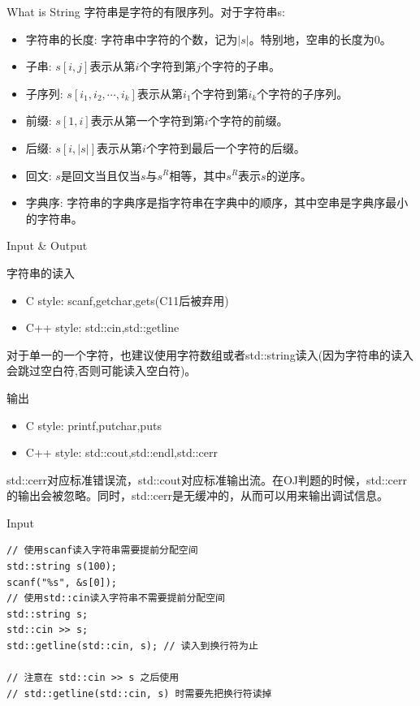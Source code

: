 \documentclass{ldr-simple-gray}
\begin{document}
  \begin{frame}{What is String}
    字符串是字符的有限序列。对于字符串s:
    \begin{itemize}
      \item 字符串的长度: 字符串中字符的个数，记为$|s|$。特别地，空串的长度为0。
      \item 子串: $s[i,j]$表示从第$i$个字符到第$j$个字符的子串。
      \item 子序列: $s[i_1,i_2,\cdots,i_k]$表示从第$i_1$个字符到第$i_k$个字符的子序列。
      \item 前缀: $s[1,i]$表示从第一个字符到第$i$个字符的前缀。
      \item 后缀: $s[i,|s|]$表示从第$i$个字符到最后一个字符的后缀。
      \item 回文: $s$是回文当且仅当$s$与$s^R$相等，其中$s^R$表示$s$的逆序。
      \item 字典序: 字符串的字典序是指字符串在字典中的顺序，其中空串是字典序最小的字符串。
    \end{itemize}
  \end{frame}

  \begin{frame}{Input \& Output}
    \begin{block}{字符串的读入}
      \begin{itemize}
        \item C style: scanf,getchar,gets(C11后被弃用)
        \item C++ style: std::cin,std::getline
      \end{itemize}
    \end{block}
    对于单一的一个字符，也建议使用字符数组或者std::string读入(因为字符串的读入会跳过空白符,否则可能读入空白符)。
    \begin{block}{输出}
      \begin{itemize}
        \item C style: printf,putchar,puts
        \item C++ style: std::cout,std::endl,std::cerr
      \end{itemize}
    \end{block}
    std::cerr对应标准错误流，std::cout对应标准输出流。在OJ判题的时候，std::cerr的输出会被忽略。同时，std::cerr是无缓冲的，从而可以用来输出调试信息。
  \end{frame}

  \begin{frame}[fragile]{Input}
    \begin{verbatim}
// 使用scanf读入字符串需要提前分配空间
std::string s(100);
scanf("%s", &s[0]);
// 使用std::cin读入字符串不需要提前分配空间
std::string s;
std::cin >> s; 
std::getline(std::cin, s); // 读入到换行符为止

// 注意在 std::cin >> s 之后使用
// std::getline(std::cin, s) 时需要先把换行符读掉\end{verbatim}
  \end{frame}
\end{document}
